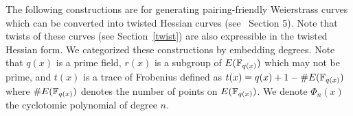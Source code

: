 The following constructions are for generating pairing-friendly Weierstrass curves
which can be converted into twisted Hessian curves (see~\cite{2015/hessian} Section 5).
Note that twists of these curves (see Section~\ref{twist}) are also expressible in the twisted Hessian form.
We categorized these constructions by embedding degrees.
Note that $q(x)$ is a prime field,
$r(x)$ is a subgroup of $E(\mathbb{F}_{q(x)})$ which may not be prime,
and $t(x)$ is a trace of Frobenius defined as $t(x) = q(x) + 1 - \#E(\mathbb{F}_{q(x)})$
where $\#E(\mathbb{F}_{q(x)})$ denotes the number of points on $E(\mathbb{F}_{q(x)})$.
We denote $\Phi_{n}(x)$ the cyclotomic polynomial of degree $n$.



